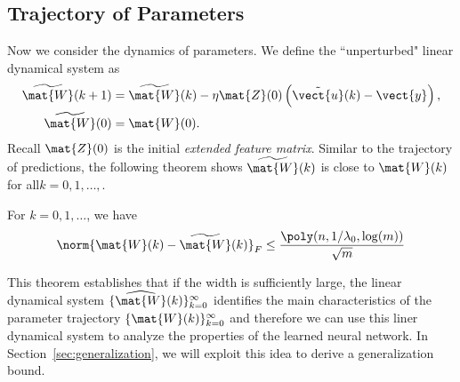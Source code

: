 \subsection{Trajectory of Parameters}
\label{sec:traj_W}
Now we consider the dynamics of parameters.
We define the ``unperturbed" linear dynamical system as \begin{align*}
	\widetilde{\mat{W}}(k+1) &= \widetilde{\mat{W}}(k) - \eta\mat{Z}(0)\left(\tilde{\vect{u}}(k)-\vect{y}\right),\\ \widetilde{\mat{W}}(0) &= \mat{W}(0). 
\end{align*}
Recall $\mat{Z}(0)$ is the initial \emph{extended feature matrix}.
Similar to the trajectory of predictions, the following theorem shows $\widetilde{\mat{W}}(k)$ is close to $\mat{W}(k)$ for all$k = 0,1,\ldots,$. 
\begin{thm}\label{thm:traj_W}
For $k=0,1,\ldots$, we have \begin{align}
	\norm{\mat{W}(k)-\widetilde{\mat{W}}(k)}_F \le \frac{\poly(n,1/\lambda_0,\log(m))}{\sqrt{m}} \label{eqn:traj_W_perturb}
\end{align}
\end{thm}

This theorem establishes that if the width is sufficiently large, the linear dynamical system $\{\widehat{\mat{W}}(k)\}_{k=0}^\infty$ identifies the main characteristics of the parameter trajectory $\{\mat{W}(k)\}_{k=0}^\infty$ and therefore we can use this liner dynamical system to analyze the properties of the learned neural network.
In Section~\ref{sec:generalization}, we will exploit this idea to derive a generalization bound.









